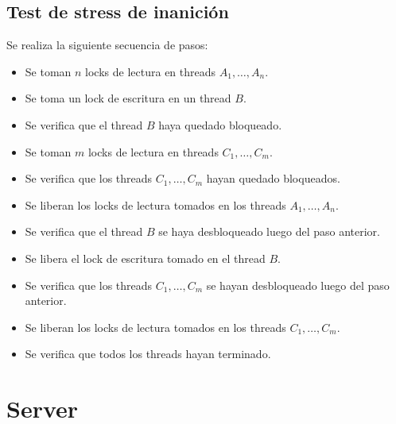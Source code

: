\documentclass[a4paper,10pt,twoside]{article}
\begin{document}
\subsection{Test de stress de inanición}

Se realiza la siguiente secuencia de pasos:

\begin{itemize}
    \item Se toman $n$ locks de lectura en threads $A_1, \ldots, A_n$.

    \item Se toma un lock de escritura en un thread $B$.

    \item Se verifica que el thread $B$ haya quedado bloqueado.

    \item Se toman $m$ locks de lectura en threads $C_1, \ldots, C_m$.

    \item Se verifica que los threads $C_1, \ldots, C_m$ hayan quedado bloqueados.

    \item Se liberan los locks de lectura tomados en los threads $A_1, \ldots, A_n$.

    \item Se verifica que el thread $B$ se haya desbloqueado luego del paso anterior.

    \item Se libera el lock de escritura tomado en el thread $B$.

    \item Se verifica que los threads $C_1, \ldots, C_m$ se hayan desbloqueado luego del paso anterior.

    \item Se liberan los locks de lectura tomados en los threads $C_1, \ldots, C_m$.

    \item Se verifica que todos los threads hayan terminado.
\end{itemize}





\section{Server}
\end{document}
